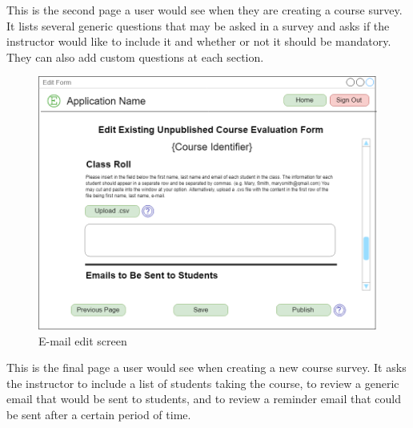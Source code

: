 \documentclass{article}
\begin{document}
This is the second page a user would see when they are creating a course survey. It lists several generic questions that may be asked in a survey and asks if the instructor would like to include it and whether or not it should be mandatory. They can also add custom questions at each section.

\begin{center}
\begin{figure}[H]
    \centering
    \caption{E-mail edit screen}
    \includegraphics[scale=.35]{images/emails_screen.png}
\end{figure}
\end{center}

This is the final page a user would see when creating a new course survey. It asks the instructor to include a list of students taking the course, to review a generic email that would be sent to students, and to review a reminder email that could be sent after a certain period of time.
\end{document}
